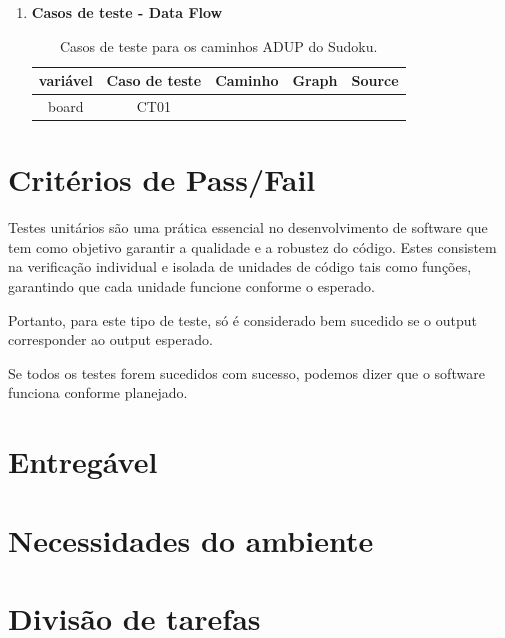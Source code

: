 \documentclass{article}
\begin{document}
\begin{itemize}
\begin{enumerate}
\begin{itemize}
\begin{itemize}
        \end{itemize}
    \end{itemize}
    \item \textbf{Casos de teste - Data Flow}
    \begin{table}[H]
        \centering
        \begin{tabular}{|c|c|c|p{4cm}|c|} %
        \hline
        \textbf{variável} & \textbf{Caso de teste} & \textbf{Caminho} & \textbf{Graph} & \textbf{Source} \\ \hline
        board & CT01 &  &  &   \\ 
        \hline
    \end{tabular}
    \caption{Casos de teste para os caminhos ADUP do Sudoku.}
    \label{tab:tabela_exemplo}
\end{table}
    
    \end{enumerate}

    
\end{itemize}



\section{Critérios de Pass/Fail}

\quad Testes unitários são uma prática essencial no desenvolvimento de software que tem como objetivo garantir a qualidade e a robustez do código. Estes consistem na verificação individual e isolada de unidades de código tais como funções, garantindo que cada unidade funcione conforme o esperado.

Portanto, para este tipo de teste, só é considerado bem sucedido se o output corresponder ao output esperado.

Se todos os testes forem sucedidos com sucesso, podemos dizer que o software funciona conforme planejado.
\section{Entregável}

\section{Necessidades do ambiente}



\section{Divisão de tarefas}
\end{document}

